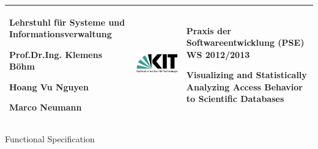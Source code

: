 \begin{titlepage}

\vspace*{-3cm}
\begin{center}

\begin{tabular}{m{5.5cm} m{5cm} m{5.5cm}}
\arrayrulecolor{Bittersweet!90}

\begin{center}
\footnotesize{
\textbf{ Lehrstuhl für Systeme und Informationsverwaltung}
\newline

Prof.Dr.Ing. Klemens Böhm

Hoang Vu Nguyen

Marco Neumann
} 	
\end{center}
   & 
\begin{center}

   \includegraphics[width=0.9\linewidth]{Pictures/KIT-Logo.png}
   
\end{center}    
   & 
\begin{center}
\footnotesize{
\textbf{Praxis der Softwareentwicklung (PSE)}\newline
WS 2012/2013\newline

Visualizing and Statistically Analyzing Access Behavior to Scientific Databases
}
\end{center}\\
\hline
 
\end{tabular}


\vspace*{5cm}

\Huge
Functional Specification

\vspace*{1.5cm}

\normalsize

\begin{center}


\end{center}
\end{center}
\end{titlepage}
